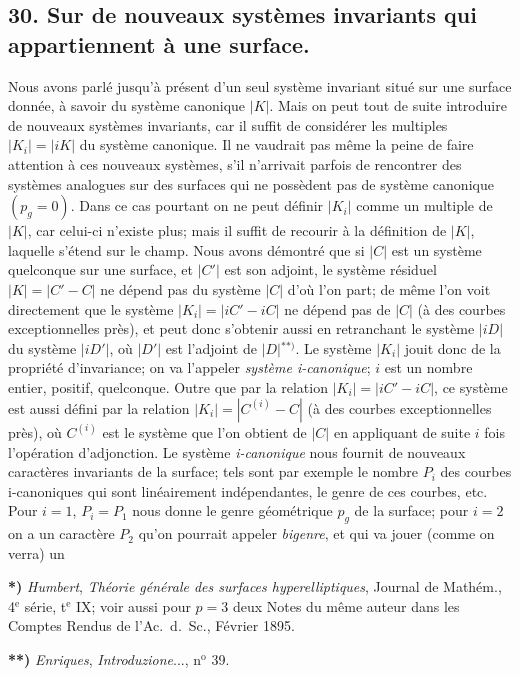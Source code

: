 \documentclass{article}
\begin{document}
\subsection*{30. Sur de nouveaux systèmes invariants qui appartiennent à une surface.}

Nous avons parlé jusqu'à présent d'un seul système invariant situé sur une surface donnée, à savoir du système canonique $|K|$. Mais on peut tout de suite introduire de nouveaux systèmes invariants, car il suffit de considérer les multiples $|K_{i}| = |iK|$ du système canonique. Il ne vaudrait pas même la peine de faire attention à ces nouveaux systèmes, s'il n'arrivait parfois de rencontrer des systèmes analogues sur des surfaces qui ne possèdent pas de système canonique $(p_{g} = 0)$. Dans ce cas pourtant on ne peut définir $|K_{i}|$ comme un multiple de $|K|$, car celui-ci n'existe plus; mais il suffit de recourir à la définition de $|K|$, laquelle s'étend sur le champ. Nous avons démontré que si $|C|$ est un système quelconque sur une surface, et $|C'|$ est son adjoint, le système résiduel $|K| = |C'-C|$ ne dépend pas du système $|C|$ d'où l'on part; de même l'on voit directement que le système $|K_{i}| = |iC'-iC|$ ne dépend pas de $|C|$ (à des courbes exceptionnelles près), et peut donc s'obtenir aussi en retranchant le système $|iD|$ du système $|iD'|$, où $|D'|$ est l'adjoint de $|D|$${}^{**)}$. Le système $|K_{i}|$ jouit donc de la propriété d'invariance; on va l'appeler \emph{système i-canonique}; $i$ est un nombre entier, positif, quelconque. Outre que par la relation $|K_{i}| = |iC'-iC|$, ce système est aussi défini par la relation $|K_{i}| = |C^{(i)}-C|$ (à des courbes exceptionnelles près), où $C^{(i)}$ est le système que l'on obtient de $|C|$ en appliquant de suite $i$ fois l'opération d'adjonction. Le système \emph{i-canonique} nous fournit de nouveaux caractères invariants de la surface; tels sont par exemple le nombre $P_{i}$ des courbes i-canoniques qui sont linéairement indépendantes, le genre de ces courbes, etc. Pour $i = 1$, $P_{i} = P_{1}$ nous donne le genre géométrique $p_{g}$ de la surface; pour $i = 2$ on a un caractère $P_{2}$ qu'on pourrait appeler \emph{bigenre}, et qui va jouer (comme on verra) un

\textbf{*)} \emph{Humbert}, \emph{Théorie générale des surfaces hyperelliptiques}, Journal de Mathém., 4${}^{\text{e}}$ série, t${}^{\text{e}}$ IX; voir aussi pour $p = 3$ deux Notes du même auteur dans les Comptes Rendus de l'Ac.\ d.\ Sc., Février 1895.

\textbf{**)} \emph{Enriques}, \emph{Introduzione}..., n${}^{\text{o}}$ 39.
\end{document}
